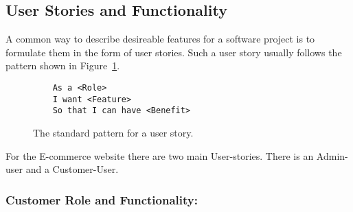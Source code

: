 \subsection{User Stories and Functionality}

A common way to describe desireable features for a software project is to
formulate them in the form of user stories. Such a user story usually follows
the pattern shown in Figure~\ref{fig:user_story}.

\begin{figure}[H]
  \centering
  \begin{verbatim}
    As a <Role>
    I want <Feature>
    So that I can have <Benefit>
  \end{verbatim}
  \caption{\label{fig:user_story} The standard pattern for a user story.}
\end{figure}

For the E-commerce website there are two main User-stories. There is an
Admin-user and a Customer-User.

\subsubsection{Customer Role and Functionality:}

